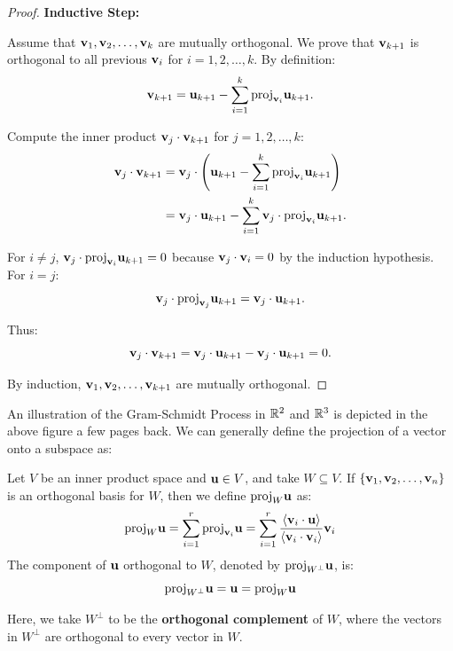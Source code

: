 \documentclass[12pt]{article}
\begin{document}
\begin{proof}
    \textbf{Inductive Step:}

    Assume that \(\mathbf{v}_1, \mathbf{v}_2, \ldots, \mathbf{v}_k\) are mutually orthogonal. We prove that \(\mathbf{v}_{k+1}\) is orthogonal to all previous \(\mathbf{v}_i\) for \(i = 1, 2, \ldots, k\). By definition:
    \[
        \mathbf{v}_{k+1} = \mathbf{u}_{k+1} - \sum_{i=1}^{k} \text{proj}_{\mathbf{v}_i}{\mathbf{u}_{k+1}}.
    \]

    Compute the inner product \(\mathbf{v}_j \cdot \mathbf{v}_{k+1}\) for \(j = 1, 2, \ldots, k\):
    \begin{align*}
        \mathbf{v}_j \cdot \mathbf{v}_{k+1} &= \mathbf{v}_j \cdot \left(\mathbf{u}_{k+1} - \sum_{i=1}^{k} \text{proj}_{\mathbf{v}_i}{\mathbf{u}_{k+1}}\right) \\
        &= \mathbf{v}_j \cdot \mathbf{u}_{k+1} - \sum_{i=1}^{k} \mathbf{v}_j \cdot \text{proj}_{\mathbf{v}_i}{\mathbf{u}_{k+1}}.
    \end{align*}

    For \(i \neq j\), \(\mathbf{v}_j \cdot \text{proj}_{\mathbf{v}_i}{\mathbf{u}_{k+1}} = 0\) because \(\mathbf{v}_j \cdot \mathbf{v}_i = 0\) by the induction hypothesis. For \(i = j\):
    \[
    \mathbf{v}_j \cdot \text{proj}_{\mathbf{v}_j}{\mathbf{u}_{k+1}} = \mathbf{v}_j \cdot \mathbf{u}_{k+1}.
    \]

    Thus:
    \[
    \mathbf{v}_j \cdot \mathbf{v}_{k+1} = \mathbf{v}_j \cdot \mathbf{u}_{k+1} - \mathbf{v}_j \cdot \mathbf{u}_{k+1} = 0.
    \]

    By induction, \(\mathbf{v}_1, \mathbf{v}_2, \ldots, \mathbf{v}_{k+1}\) are mutually orthogonal.
\end{proof}


An illustration of the Gram-Schmidt Process in $\mathbb{R}^2$ and $\mathbb{R}^3$ is depicted in the above figure a few pages back. We can generally define the projection of a vector onto a subspace as:

\begin{definition}[Projection]
    Let $V$ be an inner product space and $\mathbf{u} \in V$, and take $W \subseteq V$. If $\left\{\mathbf{v}_1, \mathbf{v}_2, \ldots, \mathbf{v}_n\right\}$ is an orthogonal basis for $W$, then we define $\text{proj}_{W}{\mathbf{u}}$ as:
    $$\text{proj}_{W}{\mathbf{u}} = \sum_{i=1}^{r}\text{proj}_{\mathbf{v}_i}{\mathbf{u}} = \sum_{i=1}^{r} \frac{\left\langle\mathbf{v}_i \cdot \mathbf{u} \right\rangle}{\left\langle\mathbf{v}_i \cdot \mathbf{v}_i \right\rangle} \mathbf{v}_i$$
    The component of $\mathbf{u}$ orthogonal to $W$, denoted by $\text{proj}_{W^\bot}{\mathbf{u}}$, is:
    $$\text{proj}_{W^\bot}{\mathbf{u}} = \mathbf{u} = \text{proj}_{W}{\mathbf{u}}$$
\end{definition}

Here, we take $W^\bot$ to be the \textbf{orthogonal complement} of $W$, where the vectors in $W^\bot$ are orthogonal to every vector in $W$. 
\end{document}
